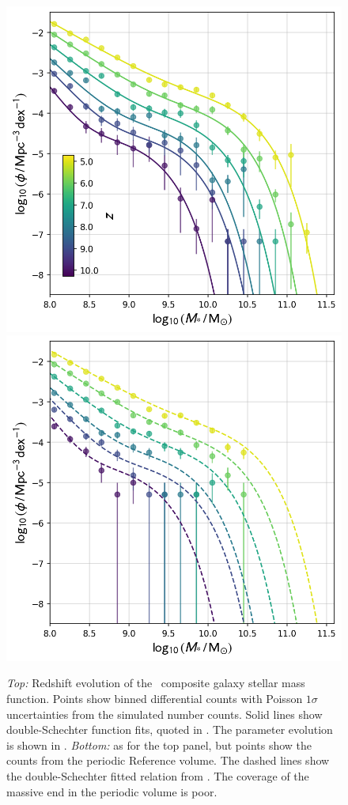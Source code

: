 \begin{figure}
	\includegraphics[width=\columnwidth]{images/gsmf_all.png}
  \includegraphics[width=\columnwidth]{images/gsmf_all_ref.png}
    \caption{\textit{Top:} Redshift evolution of the \flares\ composite galaxy stellar mass function.
    Points show binned differential counts with Poisson $1\sigma$ uncertainties from the simulated number counts.
    Solid lines show double-Schechter function fits, quoted in . The parameter evolution is shown in .
    \textit{Bottom:} as for the top panel, but points show the counts from the periodic Reference volume. The dashed lines show the double-Schechter fitted relation from \flares. The coverage of the massive end in the periodic volume is poor.
    }
    \label{fig:gsmf}
\end{figure}

